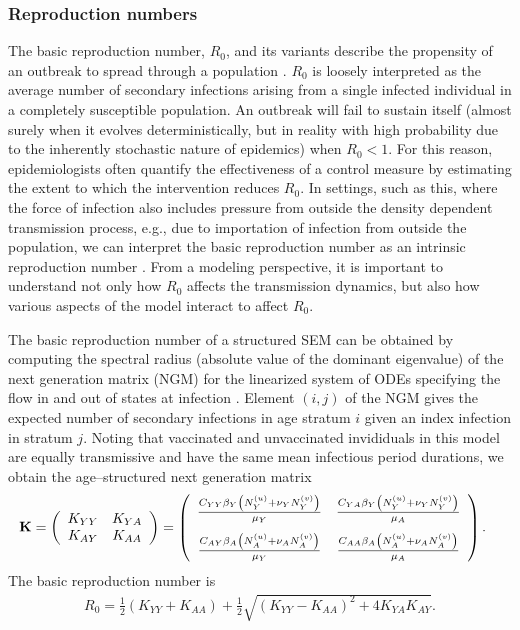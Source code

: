 \subsubsection{Reproduction numbers}
\label{subsubsec:stratmod_repnumbs}
The basic reproduction number, $ R_0 $, and its variants describe the propensity of an outbreak to spread through a population \cite{heffernan2005perspectives,van2008further}. $ R_0 $ is loosely interpreted as the average number of secondary infections arising from a single infected individual in a completely susceptible population. An outbreak will fail to sustain itself (almost surely when it evolves deterministically, but in reality with high probability due to the inherently stochastic nature of epidemics) when $ R_0 < 1 $. For this reason, epidemiologists often quantify the effectiveness of a control measure by estimating the extent to which the intervention reduces $ R_0 $. In settings, such as this, where the force of infection also includes pressure from outside the density dependent transmission process, e.g., due to importation of infection from outside the population, we can interpret the basic reproduction number as an intrinsic reproduction number \cite{blackwood2018introduction}. From a modeling perspective, it is important to understand not only how $ R_0 $ affects the transmission dynamics, but also how various aspects of the model interact to affect $ R_0 $. 

The basic reproduction number of a structured SEM can be obtained by computing the spectral radius (absolute value of the dominant eigenvalue) of the next generation matrix (NGM) for the linearized system of ODEs specifying the flow in and out of states at infection \cite{heffernan2005perspectives,van2017reproduction,van2008further}. Element $ (i,j) $ of the NGM gives the expected number of secondary infections in age stratum $ i $ given an index infection in stratum $ j $. Noting that vaccinated and unvaccinated invididuals in this model are equally transmissive and have the same mean infectious period durations, we obtain the age--structured next generation matrix
\begin{align}
\label{eqn:sirs_ngm_full}
\mathbf{K} &= 
	\left (
	\begin{array}{cc}
	K_{YY} & K_{YA} \\
	K_{AY} & K_{AA}
	\end{array}
	\right ) =\left (
	\begin{array}{cc}
	\frac{C_{YY}\beta_Y\left (N_Y^{(u)} + \nu_YN_Y^{(v)}\right )}{\mu_Y} & \frac{C_{YA}\beta_Y\left (N_Y^{(u)} + \nu_YN_Y^{(v)}\right )}{\mu_A} \\[2ex]
	\frac{C_{AY}\beta_A\left (N_A^{(u)} + \nu_AN_A^{(v)}\right )}{\mu_Y} & \frac{C_{AA}\beta_A\left (N_A^{(u)} + \nu_AN_A^{(v)}\right )}{\mu_A}
	\end{array}
	\right ).
\end{align}
The basic reproduction number is 
\begin{align}
\label{eqn:sirs_R0}
R_0 = \frac{1}{2}\left (K_{YY} + K_{AA}\right ) + \frac{1}{2}\sqrt{(K_{YY} - K_{AA})^2 + 4K_{YA}K_{AY}}.
\end{align}

